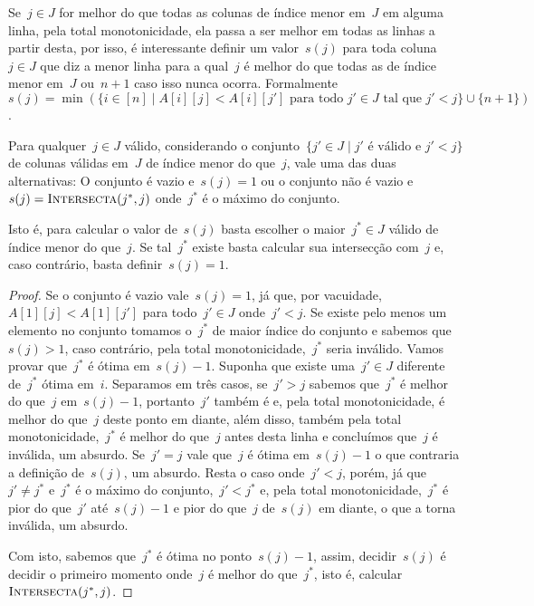 Se~$j \in J$ for melhor do que todas as colunas de índice menor em~$J$ em alguma linha, pela total monotonicidade, ela passa a ser melhor em todas as linhas a partir desta, por isso, é interessante definir um valor~$s(j)$ para toda coluna~$j \in J$ que diz a menor linha para a qual~$j$ é melhor do que todas as de índice menor em~$J$ ou~$n+1$ caso isso nunca ocorra.  Formalmente~${ s(j) = \min(\{i \in [n] \mid A[i][j] < A[i][j'] \text{ para todo } j' \in J \text{ tal que } j' < j\} \cup \{n+1\}) }$.

\begin{prop} \label{Online:convex:easys}
Para qualquer~$j \in J$ válido, considerando o conjunto~$\{j' \in J \mid j' \text{ é válido e } j' < j\}$ de colunas válidas em~$J$ de índice menor do que~$j$, vale uma das duas alternativas: O conjunto é vazio e~$s(j) = 1$ ou o conjunto não é vazio e~$s(j) = \textsc{Intersecta}(j^*,j)$ onde~$j^*$ é o máximo do conjunto.

Isto é, para calcular o valor de~$s(j)$ basta escolher o maior~$j^* \in J$ válido de índice menor do que~$j$. Se tal~$j^*$ existe basta calcular sua intersecção com~$j$ e, caso contrário, basta definir~$s(j) = 1$.
\end{prop}

\begin{proof}
Se o conjunto é vazio vale~$s(j) = 1$, já que, por vacuidade,~$A[1][j] < A[1][j']$ para todo~$j' \in J$ onde~$j' < j$. Se existe pelo menos um elemento no conjunto tomamos o~$j^*$ de maior índice do conjunto e sabemos que~$s(j) > 1$, caso contrário, pela total monotonicidade,~$j^*$ seria inválido. Vamos provar que~$j^*$ é ótima em~$s(j) - 1$. Suponha que existe uma~$j' \in J$ diferente de~$j^*$ ótima em~$i$. Separamos em três casos, se~$j'>j$ sabemos que~$j^*$ é melhor do que~$j$ em~$s(j)-1$, portanto~$j'$ também é e, pela total monotonicidade, é melhor do que~$j$ deste ponto em diante, além disso, também pela total monotonicidade,~$j^*$ é melhor do que~$j$ antes desta linha e concluímos que~$j$ é inválida, um absurdo. Se~$j' = j$ vale que~$j$ é ótima em~$s(j) - 1$ o que contraria a definição de~$s(j)$, um absurdo. Resta o caso onde~$j' < j$, porém, já que~$j' \neq j^*$ e~$j^*$ é o máximo do conjunto,~$j' < j^*$ e, pela total monotonicidade,~$j^*$ é pior do que~$j'$ até~$s(j) - 1$ e pior do que~$j$ de~$s(j)$ em diante, o que a torna inválida, um absurdo.

Com isto, sabemos que~$j^*$ é ótima no ponto~$s(j) - 1$, assim, decidir~$s(j)$ é decidir o primeiro momento onde~$j$ é melhor do que~$j^*$, isto é, calcular~$\textsc{Intersecta}(j^*,j)$.
\end{proof}

